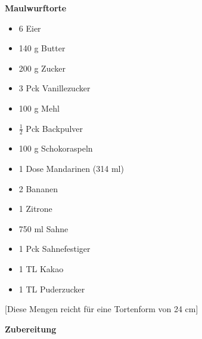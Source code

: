 

\parindent0pt	

\pagestyle{empty}


\textbf{{\LARGE Maulwurftorte}}%

\hrulefill
\vspace*{\fill}
\begin{multicols}{2}	


\begin{itemize}
\item 6 Eier
\item 140 g Butter
\item 200 g Zucker	
\item 3 Pck Vanillezucker
\item 100 g Mehl
\item $\frac{1}{2}$ Pck Backpulver
\item 100 g Schokoraspeln
\item 1 Dose Mandarinen (314 ml)
\item 2 Bananen
\item 1 Zitrone
\item 750 ml Sahne
\item 1 Pck Sahnefestiger
\item 1 TL Kakao
\item 1 TL Puderzucker
\end{itemize}
\end{multicols}
\vfill									%

\vspace{1.5cm}
%
\begin{center}
%
[Diese Mengen reicht für eine Tortenform von 24 cm]%
\end{center}


\vfill
\newpage
\textbf{{\LARGE Zubereitung}}%

\hrulefill


